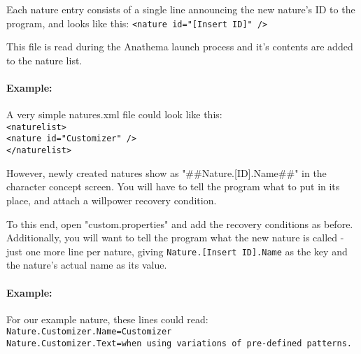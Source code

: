 Each nature entry consists of a single line announcing the new nature's ID to the program, and looks like this:
\texttt{<nature id="[Insert ID]" />}

This file is read during the Anathema launch process and it's contents are added to the
nature list. 

\paragraph{Example:} A very simple natures.xml file could look like this:\\
\texttt{<naturelist>\\
	<nature id="Customizer" />\\
</naturelist>}

However, newly created natures show as "\#\#Nature.[ID].Name\#\#" in the character concept screen. You will have to tell the program what to put in its place, and attach a willpower recovery condition.

To this end, open "custom.properties" and add the recovery conditions as before. Additionally, you will want to tell the program what the new nature is called - just one more line per nature, giving \texttt{Nature.[Insert ID].Name} as the key and the nature's actual name as its value.

\paragraph{Example:} For our example nature, these lines could read:\\
\texttt{Nature.Customizer.Name=Customizer\\
Nature.Customizer.Text=when using variations of pre-defined patterns.}